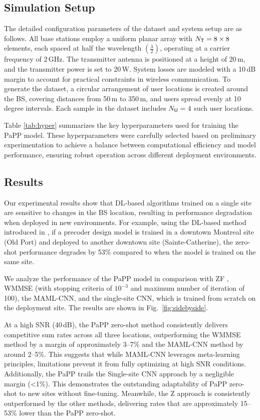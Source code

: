 \subsection{Simulation Setup}
The detailed configuration parameters of the dataset and system setup are as follows. All base stations employ a uniform planar array with $N_{\sf{T}} = 8 \times 8$ elements, each spaced at half the wavelength $(\frac{\lambda}{2})$, operating at a carrier frequency of 2\,GHz. The transmitter antenna is positioned at a height of 20\,m, and the transmitter power is set to 20\,W. System losses are modeled with a 10\,dB margin to account for practical constraints in wireless communication. To generate the dataset, a circular arrangement of user locations is created around the BS, covering distances from 50\,m to 350\,m, and users spread evenly at 10 degree intervals. Each sample in the dataset includes $N_{\sf{U}}=4$ such user locations.

Table \ref{tab:hyper} summarizes the key hyperparameters used for training the PaPP model. These hyperparameters were carefully selected based on preliminary experimentation to achieve a balance between computational efficiency and model performance, ensuring robust operation across different deployment environments.


\subsection{Results}
Our experimental results show that \gls{DL}-based algorithms trained on a single site are sensitive to changes in the \gls{BS} location, resulting in performance degradation when deployed in new environments. For example, using the \gls{DL}-based method introduced in \cite{hojatian2021unsupervised}, if a precoder design model is trained in a downtown Montreal site (Old Port) and deployed to another downtown site (Sainte-Catherine), the zero-shot performance degrades by 53\% compared to when the model is trained on the same site. 

We analyze the performance of the PaPP model in comparison with \gls{ZF} \cite{nayebi2017precoding}, \gls{WMMSE} \cite{shi2011iteratively} (with stopping criteria of $10^{-3}$ and maximum number of iteration of 100), the MAML-CNN, and the single-site CNN, which is trained from scratch on the deployment site. The results are shown in Fig.~\ref{fig:sidebyside}.

At a high SNR (40\,dB), the PaPP zero-shot method consistently delivers competitive sum rates across all three locations, outperforming the WMMSE method by a margin of approximately 3--7\% and the MAML-CNN method by around 2--5\%. This suggests that while MAML-CNN leverages meta-learning principles, limitations prevent it from fully optimizing at high SNR conditions. Additionally, the PaPP trails the Single-site CNN approach by a negligible margin (<1\%). This demonstrates the outstanding adaptability of PaPP zero-shot to new sites without fine-tuning.
Meanwhile, the Z approach is consistently outperformed by the other methods, delivering rates that are approximately 15--53\% lower than the PaPP zero-shot.

